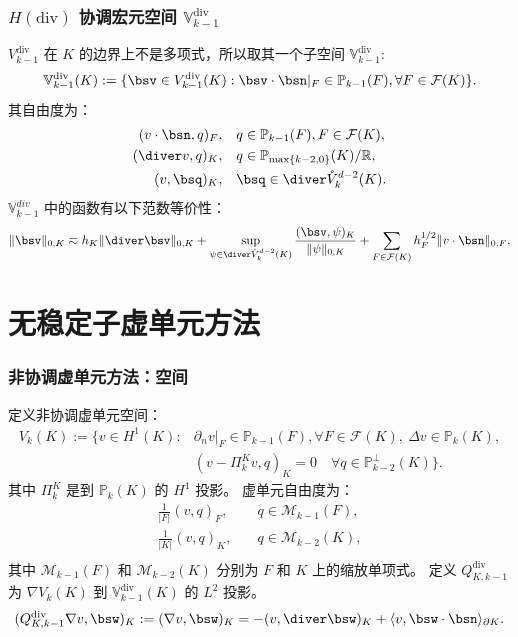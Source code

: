 \documentclass[notheorems,serif]{beamer}
\begin{document}
\begin{frame}
    \frametitle{$H(\mathrm{div})$ 协调宏元空间 $\mathbb{V}^{\mathrm{div}}_{k-1}$}
    $V^{\mathrm{div}}_{k-1}$ 在 $K$ 的边界上不是多项式，所以取其一个子空间 
    $\mathbb{V}^{\mathrm{div}}_{k-1}$:
    $$
    \mathbb{V}^{\mathrm{div}}_{k-1}(K) := \{\bsv \in
        V^{\mathrm{div}}_{k-1}(K) :
        \bsv \cdot \bsn|_F \in \mathbb{P}_{k-1}(F),
    \forall F \in \mathcal{F}(K)\}.
    $$
    其自由度为：
    $$
    \begin{aligned}
        (v\cdot\bsn,q)_{F}, & \quad
        q\in\mathbb{P}_{k-1}(F),F\in\mathcal{F}(K), \\
        (\diver v, q)_{K}, & \quad q\in\mathbb{P}_{\max\{k-2, 0\}}(K)/\mathbb{R}, \\
        (v, \bsq)_K, & \quad
        \bsq\in \diver \mathring{V}_k^{d-2}(K).
    \end{aligned}
    $$
    $\mathbb{V}_{k-1}^{div}$ 中的函数有以下范数等价性：
    $$
    \|\bsv\|_{0, K} \eqsim h_K\|\diver \bsv\|_{0, K} + 
    \sup_{\psi \in \diver \mathring{V}_k^{d-2}(K)}\frac{(\bsv,
    \psi)_K}{\|\psi\|_{0, K}} + \sum_{F \in \mathcal{F}(K)}h_F^{1/2}\|v\cdot
    \bsn\|_{0, F}.
    $$
\end{frame}

\section{无稳定子虚单元方法}
\begin{frame}
\frametitle{非协调虚单元方法：空间}
定义非协调虚单元空间：
$$
\begin{aligned}
    V_k(K) := \{v \in H^1(K): & \partial_n v|_{F} \in \mathbb{P}_{k-1}(F), 
        \forall F \in \mathcal{F}(K), \
    \Delta v \in \mathbb{P}_{k}(K),\\
    & (v-\Pi_k^K v, q)_K = 0 \quad \forall q \in
    \mathbb{P}_{k-2}^{\perp}(K)\}.
\end{aligned}
$$
其中 $\Pi_k^K$ 是到 $\mathbb{P}_k(K)$ 的 $H^1$ 投影。
虚单元自由度为：
$$
\begin{aligned}
    \frac{1}{|F|}(v, q)_{F}, & \quad q \in \mathcal{M}_{k-1}(F), \\
    \frac{1}{|K|}(v, q)_{K}, & \quad q\in \mathcal{M}_{k-2}(K), \\
\end{aligned}
$$
其中 $\mathcal{M}_{k-1}(F)$ 和 $\mathcal{M}_{k-2}(K)$ 分别为 $F$ 和 $K$
上的缩放单项式。
定义 $Q_{K, k-1}^{\mathrm{div}}$ 为 $\nabla V_k(K)$ 到
$\mathbb{V}^{\mathrm{div}}_{k-1}(K)$ 的 $L^2$ 投影。
$$
(Q_{K, k-1}^{\mathrm{div}}\nabla v, \bsw)_K := (\nabla v,
\bsw)_K = -(v, \diver \bsw)_K + \langle v, \bsw 
\cdot \bsn\rangle_{\partial K}.
$$
\end{frame}
\end{document}
